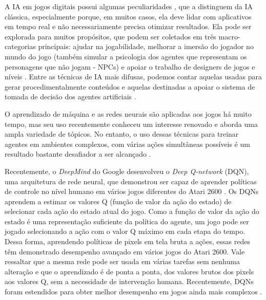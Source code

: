 A IA em jogos digitais possui algumas peculiaridades \cite{Yannakakis:2012:GAR:2212908.2212954, Millington:2009:AIG:1795711}, que a distinguem da IA clássica, especialmente porque, em muitos casos, ela deve lidar com aplicativos em tempo real e não necessariamente precisa otimizar resultados. Ela pode ser explorada para muitos propósitos, que podem ser coletados em três macro-categorias principais: ajudar na jogabilidade, melhorar a imersão do jogador no mundo do jogo (também simular a psicologia dos agentes que representam os personagens que não jogam - NPCs) e apoiar o trabalho de designers de jogos e níveis \cite{Piergigli:drl:2019}. 
Entre as técnicas de IA mais difusas, podemos contar aquelas usadas para gerar procedimentalmente conteúdos \cite{Karavolos:automated-level-design:2018,Ripamonti2017} e aquelas destinadas a apoiar o sistema de tomada de decisão dos agentes artificiais \cite{Ripamonti:Believable-group-behaviours:2017}.

O aprendizado de máquina e as redes neurais são aplicadas aos jogos há muito tempo, mas seu uso recentemente conheceu um interesse renovado e aborda uma ampla variedade de tópicos.
No entanto, o uso dessas técnicas para treinar agentes em ambientes complexos, com várias ações simultâneas possíveis é um resultado bastante desafiador a ser alcançado \cite{Piergigli:drl:2019}.

Recentemente, o \textit{DeepMind} do Google desenvolveu o \textit{Deep Q-network} (DQN), uma arquitetura de rede neural, que demonstrou ser capaz de aprender políticas de controle no nível humano em vários jogos diferentes do Atari 2600 \cite{mnih-human-control-drl}. Os DQNs aprendem a estimar os valores Q (função de valor da ação do estado) de selecionar cada ação do estado atual do jogo. Como a função de valor da ação do estado é uma representação suficiente da política do agente, um jogo pode ser jogado selecionando a ação com o valor Q máximo em cada etapa do tempo. Dessa forma, aprendendo políticas de pixels em tela bruta a ações, essas redes têm demonstrado desempenho avançado em vários jogos do Atari 2600. Vale ressaltar que a mesma rede pode ser usada em várias tarefas sem nenhuma alteração e que o aprendizado é de ponta a ponta, dos valores brutos dos pixels aos valores Q, sem a necessidade de intervenção humana. Recentemente, DQNs foram estendidos para obter melhor desempenho em jogos ainda mais complexos \cite{Debidatta:playing-games-drl:2016}.




